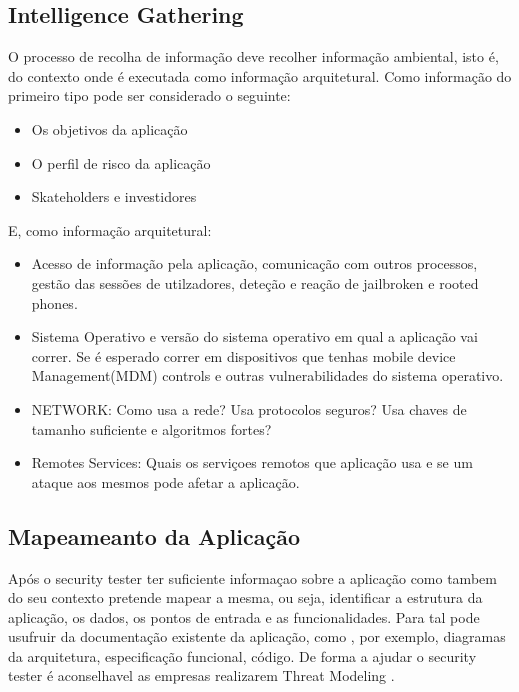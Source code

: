 \subsection{Intelligence Gathering}

O processo de recolha de informação deve recolher informação ambiental, isto é, do contexto onde é executada como informação arquitetural. Como informação do primeiro tipo pode ser considerado o seguinte:

\begin{itemize}

\item Os objetivos da aplicação
\item O perfil de risco da aplicação
\item Skateholders e investidores

\end{itemize}

E, como informação arquitetural:

\begin{itemize}

\item Acesso de informação pela aplicação, comunicação com outros processos, gestão das sessões de utilzadores, deteção e reação de jailbroken e rooted phones.

\item Sistema Operativo e versão do sistema operativo em qual a aplicação vai correr. Se é esperado correr em dispositivos que tenhas mobile device Management(MDM) controls e outras vulnerabilidades do sistema operativo.

\item NETWORK: Como usa a rede? Usa protocolos seguros? Usa chaves de tamanho suficiente e algoritmos fortes?

\item Remotes Services: Quais os serviçoes remotos que aplicação usa e se um ataque aos mesmos pode afetar a aplicação.

\end{itemize}


\subsection{Mapeameanto da Aplicação}

Após o security tester ter suficiente informaçao sobre a aplicação como tambem do seu contexto pretende mapear a mesma, ou seja, identificar a estrutura da aplicação, os dados, os pontos de entrada e as funcionalidades. Para tal pode usufruir da documentação existente da aplicação, como , por exemplo, diagramas da arquitetura, especificação funcional, código. De forma a ajudar o security tester é aconselhavel as empresas realizarem Threat Modeling \cite{ref_intro7}. 

